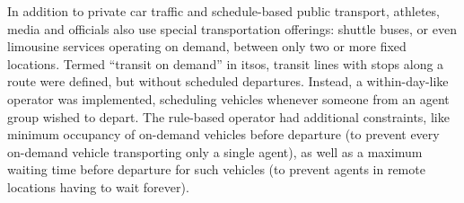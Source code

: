 In addition to private car traffic and schedule-based public transport, 
athletes, media and officials also use special transportation offerings:
shuttle buses, or even limousine services operating on demand, between only two
or more fixed locations. Termed ``transit on demand'' in \gls{itsos}, transit lines
with stops along a route were defined, but without scheduled departures. 
Instead, a within-day-like operator was implemented, scheduling vehicles
whenever someone from an agent group wished to depart. The
rule-based operator had additional constraints, like minimum occupancy of
on-demand vehicles before departure (to prevent every on-demand vehicle
transporting only a single agent), as well as a maximum waiting time before
departure for such vehicles (to prevent agents in remote locations having to
wait forever).

